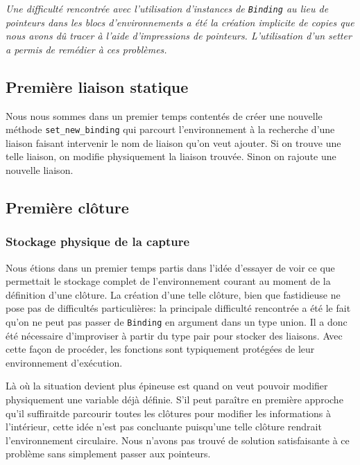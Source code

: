 \documentclass[a4paper,11pt]{article}
\newcommand{\dbend}{{\manual\char127}}
\newenvironment{attention}%
{\description\item[\dbend]\sl}%
{\enddescription}
\begin{document}
\begin{attention}
  Une difficulté rencontrée avec l'utilisation d'instances de \texttt{Binding}
  au lieu de pointeurs dans les blocs d'environnements a été la création
  implicite de copies que nous avons dû tracer à l'aide d'impressions de
  pointeurs. L'utilisation d'un setter a permis de remédier à ces problèmes.
\end{attention}

\subsection{Première liaison statique}

Nous nous sommes dans un premier temps contentés de créer une nouvelle méthode
\texttt{set\_new\_binding} qui parcourt l'environnement à la
recherche d'une liaison faisant intervenir le nom de liaison qu'on veut ajouter.
Si on trouve une telle liaison, on modifie physiquement la liaison trouvée.
Sinon on rajoute une nouvelle liaison.

\subsection{Première clôture}

\subsubsection{Stockage physique de la capture}

Nous étions dans un
premier temps partis dans l'idée d'essayer de voir ce que permettait le stockage complet de
l'environnement courant au moment de la définition d'une clôture. La création
d'une telle clôture, bien que fastidieuse ne pose pas de difficultés
particulières: la principale difficulté rencontrée a été le fait qu'on ne peut
pas passer de \texttt{Binding} en argument dans un type union. Il a donc été
nécessaire d'improviser à partir du type pair pour stocker des liaisons. Avec
cette façon de procéder, les fonctions sont typiquement protégées de leur
environnement d'exécution.

Là où la situation devient plus épineuse est quand on veut pouvoir modifier
physiquement une variable déjà définie. S'il peut paraître en première approche
qu'il \og suffirait\fg de parcourir toutes les clôtures pour modifier les
informations à l'intérieur, cette idée n'est pas concluante  puisqu'une telle clôture
rendrait l'environnement circulaire. Nous n'avons pas trouvé de solution
satisfaisante à ce problème sans simplement passer aux pointeurs.
\end{document}
